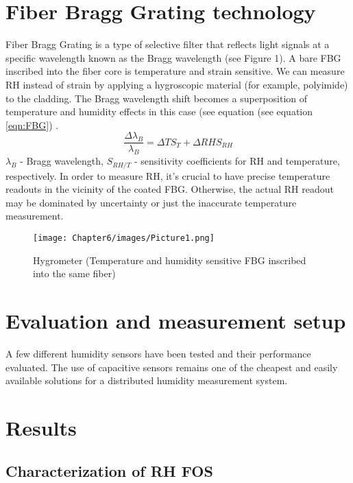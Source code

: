 \section{Fiber Bragg Grating technology}

Fiber Bragg Grating is a type of selective filter that reflects light signals at a specific wavelength known as the Bragg wavelength (see Figure 1). A bare FBG inscribed into the fiber core is temperature and strain sensitive.
We can measure RH instead of strain by applying a hygroscopic material (for example, polyimide) to the cladding. The Bragg wavelength shift becomes a superposition of temperature and humidity effects in this case (see equation (see equation \ref{eqn:FBG}) \cite{Kronenberg:02}. 
                             \begin{equation}\label{eqn:FBG}
                                    \frac{\Delta\lambda_{B}}{\lambda_{B}}=\Delta TS_{T}+\Delta RHS_{RH}
                            \end{equation}
                            $\lambda_{B}$ - Bragg wavelength, $S_{RH/T}$ - sensitivity  coefficients for RH and temperature, respectively. \newline
In order to measure RH, it’s crucial to have precise temperature readouts in the vicinity of the coated FBG. Otherwise, the actual RH readout may be dominated by uncertainty or just the inaccurate temperature measurement.

\begin{figure}[!h]
\centering
\texttt{[image: Chapter6/images/Picture1.png]}
\caption{Hygrometer (Temperature and humidity sensitive FBG inscribed into the same fiber)}
\label{fig_single_photo}
\end{figure}
\section{Evaluation and measurement setup}
A few different humidity sensors have been tested and their performance evaluated. The use of capacitive sensors remains one of the cheapest and easily available solutions for a distributed humidity measurement system. 


\section{Results}


\subsection{Characterization of RH FOS}

